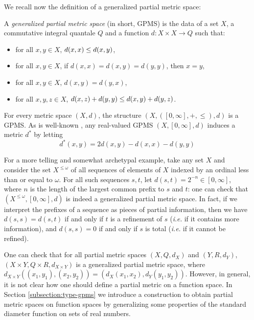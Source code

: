 We recall now the definition of a generalized partial metric space:


\begin{definition} A \emph{generalized partial metric space} (in short, GPMS) is the data of a set $X$, a commutative integral quantale $Q$ and a function $d : X \times X \to Q$ such that: \begin{itemize}
\item for all $x,y \in X$, $d(x,x) \leq d(x,y)$,
\item for all $x,y \in X$, if $d(x,x) = d(x,y) = d(y,y)$, then $x = y$,
\item for all $x,y \in X$, $d(x,y) = d(y,x)$,
\item for all $x,y,z \in X$, $d(x,z) + d(y,y) \leq d(x,y) + d(y,z)$.
\end{itemize}
\end{definition}

For every metric space $(X,d)$, the structure $(X, ([0,\infty], +, \leq), d)$ is a GPMS. 
As is well-known \cite{bkmp:partial-metrics}, any real-valued GPMS $(X,[0,\infty],d)$ induces a metric $d^{*}$ by letting 
\begin{equation}\label{eq:pmettomet} %
d^{*}(x,y)=2d(x,y)-d(x,x)-d(y,y)\tag{$\star$}
\end{equation}


For a more telling and somewhat archetypal example, take any set $X$ and consider the set $X^{\leq \omega}$ of all sequences of elements of $X$ indexed by an ordinal less than or equal to $\omega$. For all such sequences $s,t$, let $d(s,t) = 2^{-n} \in [0,\infty]$, where $n$ is the length of the largest common prefix to $s$ and $t$: one can check that $(X^{\leq \omega}, [0,\infty], d)$ is indeed a generalized partial metric space. In fact, if we interpret the prefixes of a sequence as pieces of partial information, then we have $d(s,s) = d(s,t)$ if and only if $t$ is a refinement of $s$ (\textit{i.e.} if it contains more information), and $d(s,s) = 0$ if and only if $s$ is total (\textit{i.e.} if it cannot be refined).

One can check that for all partial metric spaces $(X, Q, d_X)$ and $(Y, R, d_Y)$, $(X \times Y, Q \times R, d_{X \times Y})$ is a generalized partial metric space, where $d_{X \times Y}((x_1, y_1), (x_2, y_2)) = (d_X(x_1, x_2), d_Y(y_1, y_2))$. However, in general, it is not clear how one should define a partial metric on a function space. In  Section \ref{subsection:type-gpms} we introduce a construction to obtain partial metric spaces on function spaces by generalizing some properties of the standard diameter function on sets of real numbers.
